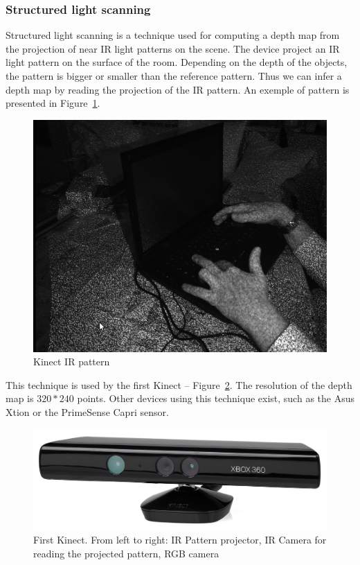 \documentclass[12pt, twoside]{article}
\begin{document}
\subsubsection{Structured light scanning}
Structured light scanning is a technique used for computing a depth map from the projection of near IR light patterns on the scene. The device project an IR light pattern on the surface of the room. Depending on the depth of the objects, the pattern is bigger or smaller than the reference pattern. Thus we can infer a depth map by reading the projection of the IR pattern. An exemple of pattern is presented in Figure~\ref{fig:kinectir}.

\begin{figure}[h]
  \centering
  \includegraphics[scale=0.3]{Kinect-ir-image.png}
  \caption{\label{fig:kinectir} Kinect IR pattern\protect\footnotemark}
\end{figure}

This technique is used by the first Kinect -- Figure~\ref{fig:kinect}. The resolution of the depth map is $320*240$ points. Other devices using this technique exist, such as the Asus Xtion or the PrimeSense Capri sensor.

\begin{figure}[h]
  \centering
  \includegraphics[scale=0.05]{kinect1.png}
  \caption{\label{fig:kinect} First Kinect. From left to right: IR Pattern projector, IR Camera for reading the projected pattern, RGB camera}
\end{figure}
\end{document}
